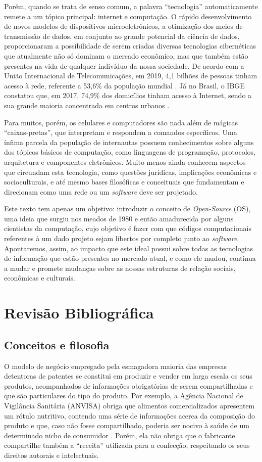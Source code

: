 \documentclass[12pt]{article}
\begin{document}
Porém, quando se trata de senso comum, a palavra ``tecnologia'' automaticamente remete a um tópico principal: internet e computação. O rápido desenvolvimento de novos modelos de dispositivos microeletrônicos, a otimização dos meios de transmissão de dados, em conjunto ao grande potencial da ciência de dados, proporcionaram a possibilidade de serem criadas diversas tecnologias cibernéticas que atualmente não só dominam o mercado econômico, mas que também estão presentes na vida de qualquer indivíduo da nossa sociedade. De acordo com a União Internacional de Telecomunicações, em 2019, 4,1 bilhões de pessoas tinham acesso à rede, referente a 53,6\% da população mundial \cite{onu2019}. Já no Brasil, o IBGE constatou que, em 2017, 74,9\% dos domicílios tinham acesso à Internet, sendo a sua grande maioria concentrada em centros urbanos \cite{ibge2017}.

Para muitos, porém, os celulares e computadores são nada além de mágicas ``caixas-pretas'', que interpretam e respondem a comandos específicos. Uma ínfima parcela da população de internautas possuem conhecimentos sobre alguns dos tópicos básicos de computação, como linguagens de programação, protocolos, arquitetura e componentes eletrônicos. Muito menos ainda conhecem aspectos que circundam esta tecnologia, como questões jurídicas, implicações econômicas e socioculturais, e até mesmo bases filosóficas e conceituais que fundamentam e direcionam como uma rede ou um \textit{software} deve ser projetado.

Este texto tem apenas um objetivo: introduzir o conceito de \textit{Open-Source} (OS), uma ideia que surgiu nos meados de 1980 e então amadurecida por alguns cientistas da computação, cujo objetivo é fazer com que códigos computacionais referentes à um dado projeto sejam libertos por completo junto ao \textit{software}. Apontaremos, assim, ao impacto que este ideal possui sobre todas as tecnologias de informação que estão presentes no mercado atual, e como ele mudou, continua a mudar e promete mudanças sobre as nossas estruturas de relação sociais, econômicas e culturais.

\newpage

\section{Revisão Bibliográfica}
\subsection{Conceitos e filosofia}
O modelo de negócio empregado pela esmagadora maioria das empresas detentoras de patentes se constitui em produzir e vender em larga escala os seus produtos, acompanhados de informações obrigatórias de serem compartilhadas e que são particulares do tipo do produto. Por exemplo, a Agência Nacional de Vigilância Sanitária (ANVISA) obriga que alimentos comercializados apresentem um rótulo nutritivo, contendo uma série de informações acerca da composição do produto e que, caso não fosse compartilhado, poderia ser nocivo à saúde de um determinado nicho de consumidor \cite{anvisa}. Porém, ela não obriga que o fabricante compartilhe também a ``receita'' utilizada para a confecção, respeitando os seus direitos autorais e intelectuais.
\end{document}
